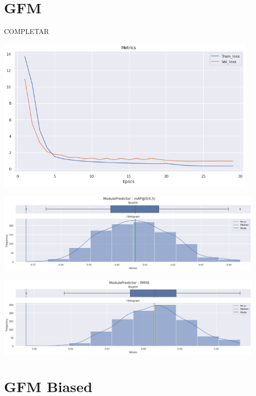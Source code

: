 \documentclass[11pt,a4paper,twoside]{thesis}
\begin{document}
\section{GFM}

COMPLETAR

\begin{center}
	\includegraphics[width=13cm]{./images/metrics-GFM-train-val-loss.png}
\end{center}

\begin{center}
\includegraphics[width=15cm]{./images/metrics-GFM-mapk.png}
\end{center}

\begin{center}
	\includegraphics[width=15cm]{./images/metrics-GFM-RMSE.png}
\end{center}



\section{GFM Biased}
\end{document}
